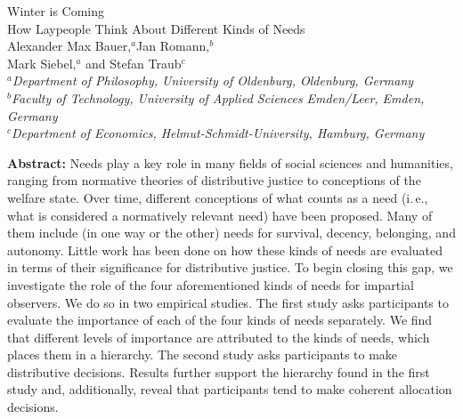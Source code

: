 \documentclass[egregdoesnotlikesansseriftitles]{scrartcl}
\begin{document}
\thispagestyle{empty}
\renewcommand{\thefootnote}{\fnsymbol{footnote}}
\begin{center}
   {\LARGE Winter is Coming}\\\vspace{2ex}
   {\Large How Laypeople Think About Different Kinds of Needs}\\\vspace{4ex}
   {\large Alexander Max Bauer,$^{a}$\footnotemark[1] Jan Romann,$^{b}$\\ Mark Siebel,$^a$ and Stefan Traub$^c$}\\\vspace{2ex}
   \textsl{\footnotesize $^{a}$Department of Philosophy, University of Oldenburg, Oldenburg, Germany}\\\vspace{0.5ex}
   \textsl{\footnotesize $^{b}$Faculty of Technology, University of Applied Sciences Emden/Leer, Emden, Germany}\\\vspace{0.5ex}
   \textsl{\footnotesize $^{c}$Department of Economics, Helmut-Schmidt-University, Hamburg, Germany}\\\vspace{2ex}
\end{center}

\vspace{\fill}\noindent\textbf{Abstract:} Needs play a key role in many fields of social sciences and humanities, ranging from normative theories of distributive justice to conceptions of the welfare state.
Over time, different conceptions of what counts as a need (i.\,e., what is considered a normatively relevant need) have been proposed.
Many of them include (in one way or the other) needs for survival, decency, belonging, and autonomy.
Little work has been done on how these kinds of needs are evaluated in terms of their significance for distributive justice.
To begin closing this gap, we investigate the role of the four aforementioned kinds of needs for impartial observers.
We do so in two empirical studies.
The first study asks participants to evaluate the importance of each of the four kinds of needs separately.
We find that different levels of importance are attributed to the kinds of needs, which places them in a hierarchy.
The second study asks participants to make distributive decisions.
Results further support the hierarchy found in the first study and, additionally, reveal that participants tend to make coherent allocation decisions.\\[0.5ex]
\end{document}
